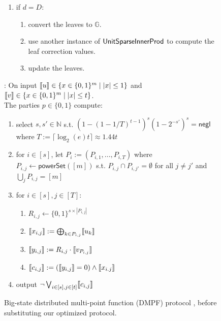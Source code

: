 \begin{figure}[!htbp]
{\begin{minipage}{.95\textwidth}
\begin{enumerate}
\begin{enumerate}
\begin{enumerate}
            \end{enumerate}
            \item if $d=D$:
            \begin{enumerate}
                \item convert the leaves to $\mathbb{G}$.            
                \item use another instance of $\mathsf{UnitSparseInnerProd}$ to compute the leaf correction values. 
                \item update the leaves.            
            \end{enumerate}
        \end{enumerate}
    \end{enumerate}
    \vspace{10px}
    \SharedIPD: On input $\share{u}\in \{x\in\{0,1\}^m \mid |x|\leq 1\}$ and $\share{v}\in \{x\in\{0,1\}^m \mid |x|\leq t\}$.\\
    The parties $p\in \{0,1\}$ compute:
    \begin{enumerate}
        \item select $s,s'\in \mathbb{N}$ s.t. $(1-(1-1/T)^{t-1})^s(1-2^{-s'})^s=\mathsf{negl}$ where $T:=\lceil\log_2(e)t\rceil\approx 1.44t$
        \item for $i\in [s]$, let $P_i:=(P_{i,1},...,P_{i,T})$ where $P_{i,j} \gets \mathsf{powerSet}([m])$ s.t. $P_{i,j}\cap P_{i,j'}=\emptyset$ for all $j\neq j'$ and $\bigcup_j P_{i,j} = [m]$
        \item for $i\in [s], j\in [T]$:
        \begin{enumerate}
            \item $R_{i,j}\gets\{0,1\}^{s\times |P_{i,j}|}$
            \item $\share{x_{i,j}}:=\bigoplus_{k\in P_{i,j}} \share{u_k}$
            \item $\share{y_{i,j}}:=R_{i,j} \cdot \share{v_{P_{i,j}}}$
            \item $\share{c_{i,j}}:= (\share{y_{i,j}} = 0) \wedge \share{x_{i.j}}$
        \end{enumerate}
        \item output $\neg \bigvee_{i\in[s],j\in[t]}\share{c_{i,j}}$
    \end{enumerate}
    \end{minipage}}
\caption{%
  Big-state distributed multi-point function (DMPF) protocol \cite{dmpf},
  before substituting our optimized \SharedIPD protocol. \label{fig:BS-Dmpf}
}
\end{figure}


